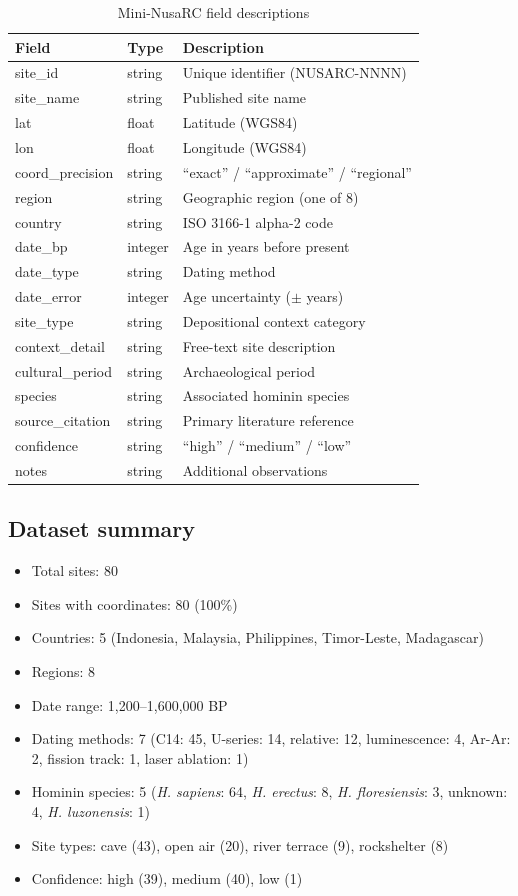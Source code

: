 \documentclass[11pt]{article}
\begin{document}
\begin{table}[h]
\centering
\small
\caption{Mini-NusaRC field descriptions}
\begin{tabular}{llp{6.5cm}}
\toprule
\textbf{Field} & \textbf{Type} & \textbf{Description} \\
\midrule
site\_id & string & Unique identifier (NUSARC-NNNN) \\
site\_name & string & Published site name \\
lat & float & Latitude (WGS84) \\
lon & float & Longitude (WGS84) \\
coord\_precision & string & ``exact'' / ``approximate'' / ``regional'' \\
region & string & Geographic region (one of 8) \\
country & string & ISO 3166-1 alpha-2 code \\
date\_bp & integer & Age in years before present \\
date\_type & string & Dating method \\
date\_error & integer & Age uncertainty ($\pm$ years) \\
site\_type & string & Depositional context category \\
context\_detail & string & Free-text site description \\
cultural\_period & string & Archaeological period \\
species & string & Associated hominin species \\
source\_citation & string & Primary literature reference \\
confidence & string & ``high'' / ``medium'' / ``low'' \\
notes & string & Additional observations \\
\bottomrule
\end{tabular}
\end{table}

\subsection{Dataset summary}

\begin{itemize}
    \item Total sites: 80
    \item Sites with coordinates: 80 (100\%)
    \item Countries: 5 (Indonesia, Malaysia, Philippines, Timor-Leste, Madagascar)
    \item Regions: 8
    \item Date range: 1,200--1,600,000 BP
    \item Dating methods: 7 (C14: 45, U-series: 14, relative: 12, luminescence: 4, Ar-Ar: 2, fission track: 1, laser ablation: 1)
    \item Hominin species: 5 (\textit{H. sapiens}: 64, \textit{H. erectus}: 8, \textit{H. floresiensis}: 3, unknown: 4, \textit{H. luzonensis}: 1)
    \item Site types: cave (43), open air (20), river terrace (9), rockshelter (8)
    \item Confidence: high (39), medium (40), low (1)
\end{itemize}
\end{document}
